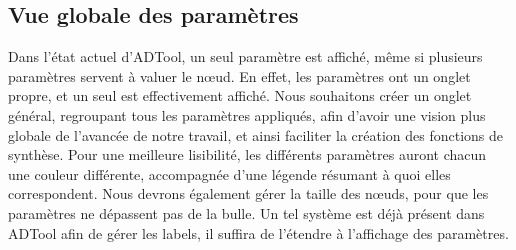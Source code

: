 	\subsection{Vue globale des paramètres}
	Dans l'état actuel d'ADTool, un seul paramètre est affiché, même si plusieurs paramètres servent à valuer le nœud. En effet, les paramètres ont un onglet propre, et un seul est effectivement affiché. Nous souhaitons créer un onglet général, regroupant tous les paramètres appliqués, afin d'avoir une vision plus globale de l'avancée de notre travail, et ainsi faciliter la création des fonctions de synthèse.
	Pour une meilleure lisibilité, les différents paramètres auront chacun une couleur différente, accompagnée d'une légende résumant à quoi elles correspondent.
	Nous devrons également gérer la taille des nœuds, pour que les paramètres ne dépassent pas de la bulle. Un tel système est déjà présent dans ADTool afin de gérer les labels, il suffira de l'étendre à l'affichage des paramètres.
